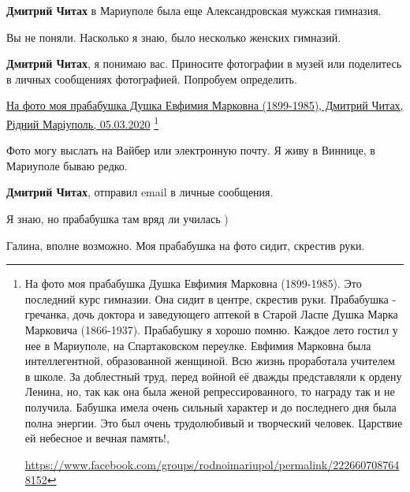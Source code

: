 \begin{itemize}
\begin{itemize}
\textbf{Дмитрий Читах} в Мариуполе была еще Александровская мужская гимназия.
\end{itemize} %


Вы не поняли. Насколько я знаю, было несколько женских гимназий.

\begin{itemize} %
\textbf{Дмитрий Читах}, я понимаю вас. Приносите фотографии в музей или поделитесь в личных сообщениях фотографией. Попробуем определить.
\end{itemize} %


\href{https://www.facebook.com/groups/rodnoimariupol/permalink/2226607087648152}{%
На фото моя прабабушка Душка Евфимия Марковна (1899-1985), Дмитрий Читах, Рідний Маріуполь, 05.03.2020}
\footnote{На фото моя прабабушка Душка Евфимия Марковна (1899-1985). Это последний курс гимназии. Она сидит в центре, скрестив руки. Прабабушка - гречанка, дочь доктора и заведующего аптекой в Старой Ласпе Душка Марка Марковича (1866-1937). Прабабушку я хорошо помню. Каждое лето гостил у нее в Мариуполе, на Спартаковском переулке. Евфимия Марковна была интеллегентной, образованной женщиной. Всю жизнь проработала учителем в школе. За доблестный труд, перед войной её дважды представляли к ордену Ленина, но, так как она была женой репрессированного, то награду так и не получила. Бабушка имела очень сильный характер и до последнего дня была полна энергии. Это был очень трудолюбивый и творческий человек. Царствие ей небесное и вечная память!,\par \url{https://www.facebook.com/groups/rodnoimariupol/permalink/2226607087648152}}


Фото могу выслать на Вайбер или электронную почту. Я живу в Виннице, в Мариуполе бываю редко. 

\begin{itemize} %
\textbf{Дмитрий Читах}, отправил email в личные сообщения.
\end{itemize} %


Я знаю, но прабабушка там вряд ли училась )


Галина, вполне возможно. Моя прабабушка на фото сидит, скрестив руки.


\end{itemize}
